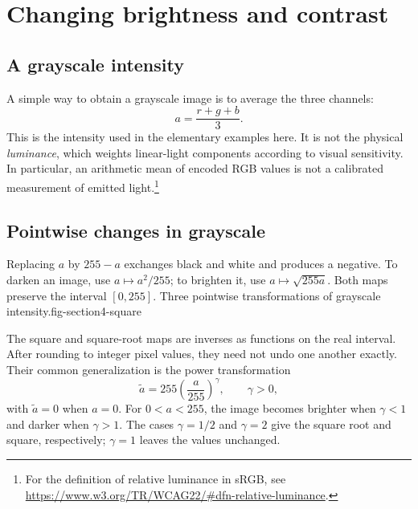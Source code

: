 \section{Changing brightness and contrast}
\subsection{A grayscale intensity}
A simple way to obtain a grayscale image is to average the three channels:
\[
 a=\frac{r+g+b}{3}.
\]
This is the intensity used in the elementary examples here. It is not the physical \emph{luminance}, which weights linear-light components according to visual sensitivity. In particular, an arithmetic mean of encoded RGB values is not a calibrated measurement of emitted light.\footnote{For the definition of relative luminance in sRGB, see \url{https://www.w3.org/TR/WCAG22/\#dfn-relative-luminance}.}

\subsection{Pointwise changes in grayscale}
Replacing $a$ by $255-a$ exchanges black and white and produces a negative. To darken an image, use $a\mapsto a^2/255$; to brighten it, use $a\mapsto\sqrt{255a}$. Both maps preserve the interval $[0,255]$.
{Three pointwise transformations of grayscale intensity.}{fig-section4-square}

The square and square-root maps are inverses as functions on the real interval. After rounding to integer pixel values, they need not undo one another exactly. Their common generalization is the power transformation
\[
 \widetilde a=255\left(\frac a{255}\right)^\gamma,
 \qquad \gamma>0,
\]
with $\widetilde a=0$ when $a=0$. For $0<a<255$, the image becomes brighter when $\gamma<1$ and darker when $\gamma>1$. The cases $\gamma=1/2$ and $\gamma=2$ give the square root and square, respectively; $\gamma=1$ leaves the values unchanged.

